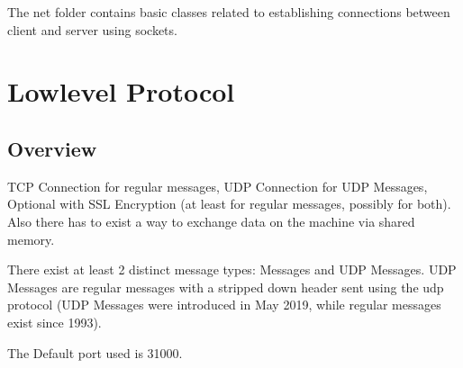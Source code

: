 \renewcommand{\namespace}{kernel::net::}


\newenvironment{messagetypes}{\rowcolors{2}{evnt.light}{evnt.dark}\mbox{}\\
	\begin{longtable}{||p{7.4cm}|p{.5cm}|p{6cm}||} 
		\rowcolor{evnt.head} \hline \textbf{Name} & \textbf{ID} & \textbf{Comment} \\ \hline\hline}{\end{longtable}}

\newenvironment{messagedesc}{\rowcolors{2}{evnt.light}{evnt.dark}\mbox{}\\
	\begin{longtable}{||p{3.4cm}|p{2.5cm}|p{8cm}||}
		\rowcolor{evnt.head} \hline \textbf{Name} & \textbf{Length} & \textbf{Comment} \\ \hline\hline}{\end{longtable}}

\newcommand{\messageType}[3]{\lstinline|#1| & #2 & #3 \\
	\hline}

\newcommand{\messageTypeDep}[3]{\rowcolor{linedeprecated}\lstinline|#1| & #2 & \color{red}\textbf{!!! DEPRECATED !!! DO NOT USE !!!}\color{black}, #3 \\
	\hline}

The net folder contains basic classes related to establishing connections between client and server using sockets.

\section{Lowlevel Protocol}

\subsection{Overview}

TCP Connection for regular messages, UDP Connection for UDP Messages, Optional with SSL Encryption (at least for regular messages, possibly for both). Also there has to exist a way to exchange data on the machine via shared memory.

There exist at least 2 distinct message types: Messages and UDP Messages. UDP Messages are regular messages with a stripped down header sent using the udp protocol (UDP Messages were introduced in May 2019, while regular messages exist since 1993).

The Default port used is 31000.



